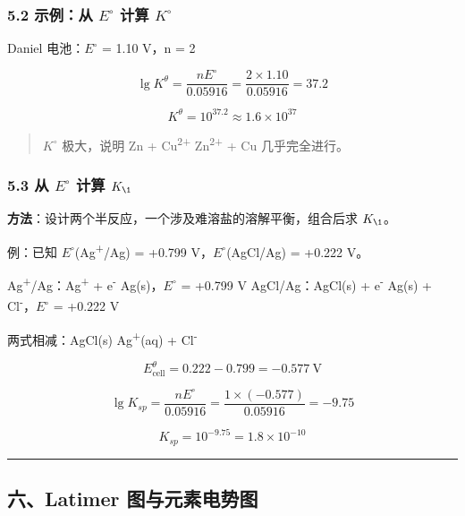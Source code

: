 \subsubsection{\texorpdfstring{5.2 示例：从 \(E^{\circ}\) 计算 \(K^{\circ}\)}{5.2 示例：从 E\^{}\{\textbackslash circ\} 计算 K\^{}\{\textbackslash circ\}}}\label{ux793aux4f8bux4ece-ecirc-ux8ba1ux7b97-kcirc}

Daniel 电池：\(E^{\circ}\) = 1.10 V，n = 2

\[
\lg K^\theta = \frac{nE^\circ}{0.05916} = \frac{2 \times 1.10}{0.05916} = 37.2
\]

\[
K^\theta = 10^{37.2} \approx 1.6 \times 10^{37}
\]

\begin{quote}
\(K^{\circ}\) 极大，说明 Zn + Cu\textsuperscript{2+} \箭 Zn\textsuperscript{2+} + Cu 几乎完全进行。
\end{quote}

\subsubsection{\texorpdfstring{5.3 从 \(E^{\circ}\) 计算 \(K_{\1}\)}{5.3 从 E\^{}\{\textbackslash circ\} 计算 K\_\{\textbackslash1\}}}\label{ux4ece-ecirc-ux8ba1ux7b97-k_1}

\textbf{方法}：设计两个半反应，一个涉及难溶盐的溶解平衡，组合后求 \(K_{\1}\)。

例：已知 \(E^{\circ}\)(Ag\textsuperscript{+}/Ag) = +0.799 V，\(E^{\circ}\)(AgCl/Ag) = +0.222 V。

Ag\textsuperscript{+}/Ag：Ag\textsuperscript{+} + e\textsuperscript{-} \箭 Ag(s)，\(E^{\circ}\) = +0.799 V
AgCl/Ag：AgCl(s) + e\textsuperscript{-} \箭 Ag(s) + Cl\textsuperscript{-}，\(E^{\circ}\) = +0.222 V

两式相减：AgCl(s) \箭 Ag\textsuperscript{+}(aq) + Cl\textsuperscript{-}

\[E_{\text{cell}}^\theta = 0.222 - 0.799 = -0.577\ \mathrm{V}\]

\[\lg K_{sp} = \frac{nE^\circ}{0.05916} = \frac{1 \times (-0.577)}{0.05916} = -9.75\]

\[K_{sp} = 10^{-9.75} = 1.8 \times 10^{-10}\]

\begin{center}\rule{0.5\linewidth}{0.5pt}\end{center}

\subsection{六、Latimer 图与元素电势图}\label{ux516dlatimer-ux56feux4e0eux5143ux7d20ux7535ux52bfux56fe}

